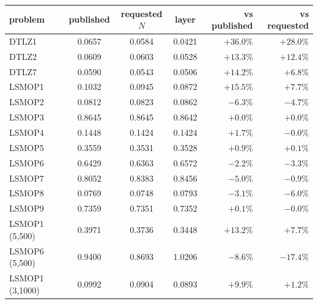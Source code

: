 \footnotesize
\setlength{\tabcolsep}{4pt}
\begin{tabular}{lccc rr}
\toprule
problem & published & requested $N$ & layer & vs published & vs requested \\
\midrule
DTLZ1 & 0.0657 & 0.0584 & 0.0421 & $+36.0\%$ & $+28.0\%$ \\
DTLZ2 & 0.0609 & 0.0603 & 0.0528 & $+13.3\%$ & $+12.4\%$ \\
DTLZ7 & 0.0590 & 0.0543 & 0.0506 & $+14.2\%$ & $+6.8\%$ \\
LSMOP1 & 0.1032 & 0.0945 & 0.0872 & $+15.5\%$ & $+7.7\%$ \\
LSMOP2 & 0.0812 & 0.0823 & 0.0862 & $-6.3\%$ & $-4.7\%$ \\
LSMOP3 & 0.8645 & 0.8645 & 0.8642 & $+0.0\%$ & $+0.0\%$ \\
LSMOP4 & 0.1448 & 0.1424 & 0.1424 & $+1.7\%$ & $-0.0\%$ \\
LSMOP5 & 0.3559 & 0.3531 & 0.3528 & $+0.9\%$ & $+0.1\%$ \\
LSMOP6 & 0.6429 & 0.6363 & 0.6572 & $-2.2\%$ & $-3.3\%$ \\
LSMOP7 & 0.8052 & 0.8383 & 0.8456 & $-5.0\%$ & $-0.9\%$ \\
LSMOP8 & 0.0769 & 0.0748 & 0.0793 & $-3.1\%$ & $-6.0\%$ \\
LSMOP9 & 0.7359 & 0.7351 & 0.7352 & $+0.1\%$ & $-0.0\%$ \\
LSMOP1 (5,500) & 0.3971 & 0.3736 & 0.3448 & $+13.2\%$ & $+7.7\%$ \\
LSMOP6 (5,500) & 0.9400 & 0.8693 & 1.0206 & $-8.6\%$ & $-17.4\%$ \\
LSMOP1 (3,1000) & 0.0992 & 0.0904 & 0.0893 & $+9.9\%$ & $+1.2\%$ \\
\bottomrule
\end{tabular}
